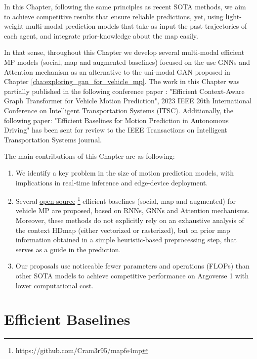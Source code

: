In this Chapter, following the same principles as recent \ac{SOTA} methods, we aim to achieve competitive results that ensure reliable predictions, yet, using light-weight multi-modal prediction models that take as input the past trajectories of each agent, and integrate prior-knowledge about the map easily.

In that sense, throughout this Chapter we develop several multi-modal efficient \ac{MP} models (social, map and augmented baselines) focused on the use \acfp{GNN} and Attention mechanism as an alternative to the uni-modal \ac{GAN} proposed in Chapter \ref{cha:exploring_gan_for_vehicle_mp}. The work in this Chapter was partially published in the following conference paper \cite{gomez2023efficientgraphtransformer}: "Efficient Context-Aware Graph Transformer for Vehicle Motion Prediction", 2023 IEEE 26th International Conference on Intelligent Transportation Systems (ITSC). Additionally, the following paper: "Efficient Baselines for Motion Prediction in Autonomous Driving" has been sent for review to the IEEE Transactions on Intelligent Transportation Systems journal.

The main contributions of this Chapter are as following: 

\begin{enumerate}
	
	\item We identify a key problem in the size of motion prediction models, with implications in real-time inference and edge-device deployment.
	
	\item Several \href{https://github.com/Cram3r95/mapfe4mp}{open-source} \footnote{https://github.com/Cram3r95/mapfe4mp} efficient baselines (social, map and augmented) for vehicle \ac{MP} are proposed, based on \acp{RNN}, \acp{GNN} and Attention mechanisms. Moreover, these methods do not explicitly rely on an exhaustive analysis of the context \ac{HDmap} (either vectorized or rasterized), but on prior map information obtained in a simple heuristic-based preprocessing step, that serves as a guide in the prediction.
	
	\item Our proposals use noticeable fewer parameters and operations (\acfp{FLOP}) than other \ac{SOTA} models to achieve competitive performance on Argoverse 1 \cite{chang2019argoverse} with lower computational cost.
	
\end{enumerate} 

\section{Efficient Baselines}
\label{sec:6_efficient_baselines}


